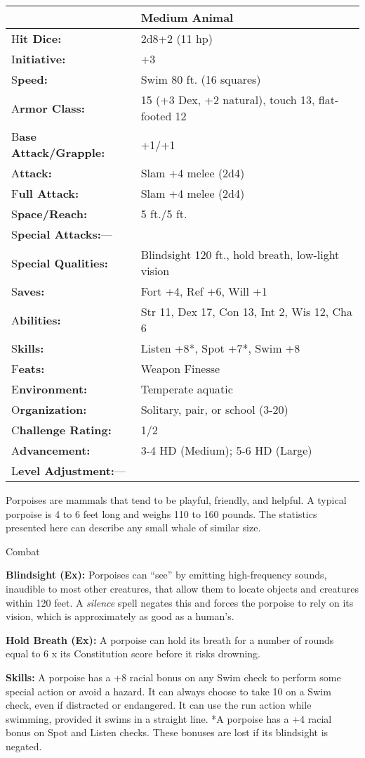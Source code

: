 \documentclass{article}
\begin{document}
\begin{tabular}{|>{\raggedright}p{91pt}|>{\raggedright}p{193pt}|}
\hline
  & Medium Animal\tabularnewline
\hline
H\textbf{it Dice:} & 2d8+2 (11 hp)\tabularnewline
\hline
I\textbf{nitiative:} & +3\tabularnewline
\hline
S\textbf{peed:} & Swim 80 ft. (16 squares)\tabularnewline
\hline
A\textbf{rmor Class:} & 15 (+3 Dex, +2 natural), touch 13, flat-footed 12\tabularnewline
\hline
B\textbf{ase Attack/Grapple:} & +1/+1\tabularnewline
\hline
A\textbf{ttack:} & Slam +4 melee (2d4)\tabularnewline
\hline
F\textbf{ull Attack:} & Slam +4 melee (2d4)\tabularnewline
\hline
S\textbf{pace/Reach:} & 5 ft./5 ft.\tabularnewline
\hline
S\textbf{pecial Attacks:}--- & \tabularnewline
\hline
S\textbf{pecial Qualities:} & Blindsight 120 ft., hold breath, low-light vision\tabularnewline
\hline
S\textbf{aves:} & Fort +4, Ref +6, Will +1\tabularnewline
\hline
A\textbf{bilities:} & Str 11, Dex 17, Con 13, Int 2, Wis 12, Cha 6\tabularnewline
\hline
S\textbf{kills:} & Listen +8*, Spot +7*, Swim +8\tabularnewline
\hline
F\textbf{eats:} & Weapon Finesse\tabularnewline
\hline
E\textbf{nvironment:} & Temperate aquatic\tabularnewline
\hline
O\textbf{rganization:} & Solitary, pair, or school (3-20)\tabularnewline
\hline
C\textbf{hallenge Rating:} & 1/2\tabularnewline
\hline
A\textbf{dvancement:} & 3-4 HD (Medium); 5-6 HD (Large)\tabularnewline
\hline
L\textbf{evel Adjustment:}--- & \tabularnewline
\hline
\end{tabular}

Porpoises are mammals that tend to be playful, friendly, and helpful. A typical 
porpoise is 4 to 6 feet long and weighs 110 to 160 pounds. The statistics presented 
here can describe any small whale of similar size.

Combat

\textbf{Blindsight (Ex): }Porpoises can ``see'' by emitting high-frequency sounds, 
inaudible to most other creatures, that allow them to locate objects and creatures 
within 120 feet. A \textit{silence }spell negates this and forces the porpoise 
to rely on its vision, which is approximately as good as a human's.

\textbf{Hold Breath (Ex): }A porpoise can hold its breath for a number of rounds 
equal to 6 x $ $its Constitution score before it risks drowning.

\textbf{Skills: }A porpoise has a +8 racial bonus on any Swim check to perform 
some special action or avoid a hazard. It can always choose to take 10 on a Swim 
check, even if distracted or endangered. It can use the run action while swimming, 
provided it swims in a straight line. *A porpoise has a +4 racial bonus on Spot 
and Listen checks. These bonuses are lost if its blindsight is negated.
\end{document}
